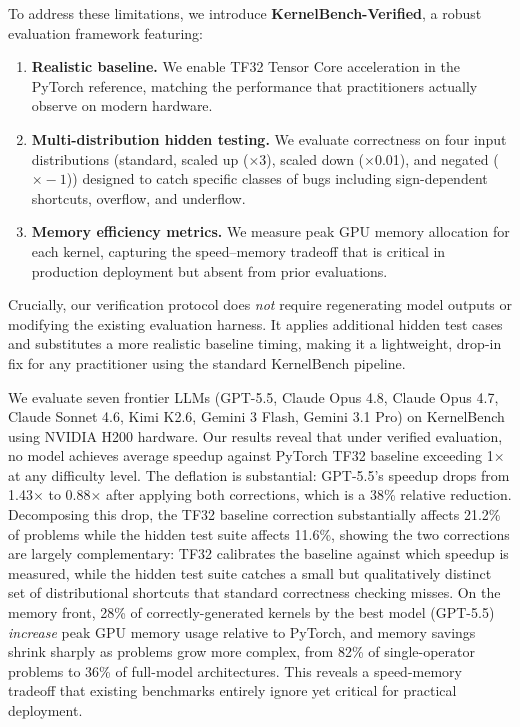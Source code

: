 \documentclass[]{fairmeta}
\begin{document}
To address these limitations, we introduce \textbf{KernelBench-Verified}, a robust evaluation framework featuring:
\begin{enumerate}[nosep]
\item \textbf{Realistic baseline.} We enable TF32 Tensor Core acceleration in the PyTorch reference, matching the performance that practitioners actually observe on modern hardware.
\item \textbf{Multi-distribution hidden testing.} We evaluate correctness on four input distributions (standard, scaled up ($\times$3), scaled down ($\times$0.01), and negated ($\times{-}1$)) designed to catch specific classes of bugs including sign-dependent shortcuts, overflow, and underflow.
\item \textbf{Memory efficiency metrics.} We measure peak GPU memory allocation for each kernel, capturing the speed--memory tradeoff that is critical in production deployment but absent from prior evaluations.
\end{enumerate}

Crucially, our verification protocol does \emph{not} require regenerating model outputs or modifying the existing evaluation harness. It applies additional hidden test cases and substitutes a more realistic baseline timing, making it a lightweight, drop-in fix for any practitioner using the standard KernelBench pipeline.

We evaluate seven frontier LLMs (GPT-5.5, Claude Opus 4.8, Claude Opus 4.7, Claude Sonnet 4.6, Kimi K2.6, Gemini 3 Flash, Gemini 3.1 Pro) on KernelBench using NVIDIA H200 hardware. Our results reveal that under verified evaluation, no model achieves average speedup against PyTorch TF32 baseline exceeding 1$\times$ at any difficulty level. The deflation is substantial: GPT-5.5's speedup drops from 1.43$\times$ to 0.88$\times$ after applying both corrections, which is a 38\% relative reduction. Decomposing this drop, the TF32 baseline correction substantially affects 21.2\% of problems while the hidden test suite affects 11.6\%, showing the two corrections are largely complementary: TF32 calibrates the baseline against which speedup is measured, while the hidden test suite catches a small but qualitatively distinct set of distributional shortcuts that standard correctness checking misses.
On the memory front, 28\% of correctly-generated kernels by the best model (GPT-5.5) \emph{increase} peak GPU memory usage relative to PyTorch, and memory savings shrink sharply as problems grow more complex, from 82\% of single-operator problems to 36\% of full-model architectures. This reveals a speed-memory tradeoff that existing benchmarks entirely ignore yet critical for practical deployment.
\end{document}

